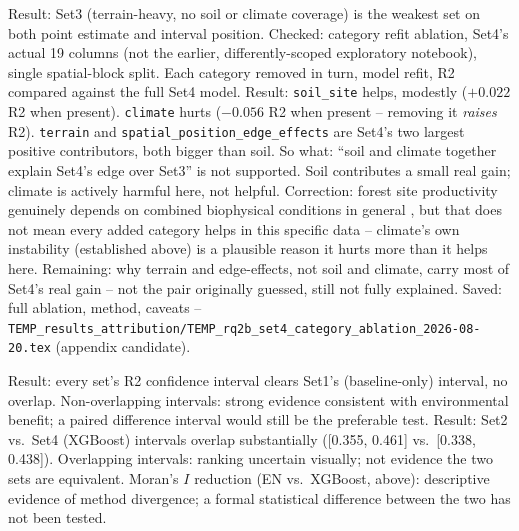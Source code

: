 \documentclass[logo,msc,ai]{infthesis}           %
\begin{document}
Result: Set3 (terrain-heavy, no soil or climate coverage) is the weakest set on
both point estimate and interval position.
Checked: category refit ablation, Set4's actual 19 columns (not the earlier,
differently-scoped exploratory notebook), single spatial-block split. Each
category removed in turn, model refit, R2 compared against the full Set4 model.
Result: \texttt{soil\_site} helps, modestly ($+0.022$ R2 when present).
\texttt{climate} hurts ($-0.056$ R2 when present -- removing it \emph{raises} R2).
\texttt{terrain} and \texttt{spatial\_position\_edge\_effects} are Set4's two
largest positive contributors, both bigger than soil.
So what: ``soil and climate together explain Set4's edge over Set3'' is not
supported. Soil contributes a small real gain; climate is actively harmful here,
not helpful.
Correction: forest site productivity genuinely depends on combined biophysical
conditions in general \cite{bontemps2014Predictive_C2_BG}, but that does not mean
every added category helps in this specific data -- climate's own instability
(established above) is a plausible reason it hurts more than it helps here.
Remaining: why terrain and edge-effects, not soil and climate, carry most of
Set4's real gain -- not the pair originally guessed, still not fully explained.
Saved: full ablation, method, caveats --
\texttt{TEMP\_results\_attribution/TEMP\_rq2b\_set4\_category\_ablation\_2026-08-20.tex}
(appendix candidate).

Result: every set's R2 confidence interval clears Set1's (baseline-only) interval,
no overlap.
Non-overlapping intervals: strong evidence consistent with environmental benefit; a
paired difference interval would still be the preferable test.
Result: Set2 vs.\ Set4 (XGBoost) intervals overlap substantially ([0.355, 0.461]
vs.\ [0.338, 0.438]).
Overlapping intervals: ranking uncertain visually; not evidence the two sets are
equivalent.
Moran's $I$ reduction (EN vs.\ XGBoost, above): descriptive evidence of method
divergence; a formal statistical difference between the two has not been tested.
\end{document}
